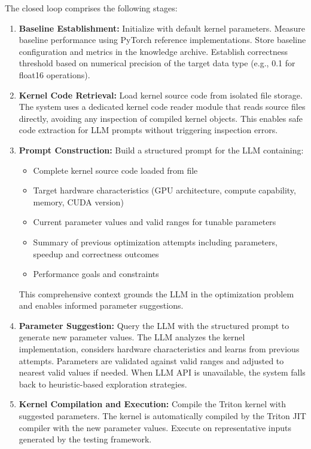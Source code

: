 \documentclass{article}
\begin{document}
The closed loop comprises the following stages:
\begin{enumerate}
    \item {\textbf{Baseline Establishment:} Initialize with default kernel parameters. Measure baseline performance using PyTorch reference implementations. Store baseline configuration and metrics in the knowledge archive. Establish correctness threshold based on numerical precision of the target data type (e.g., 0.1 for float16 operations).}

    \item {\textbf{Kernel Code Retrieval:} Load kernel source code from isolated file storage. The system uses a dedicated kernel code reader module that reads source files directly, avoiding any inspection of compiled kernel objects. This enables safe code extraction for LLM prompts without triggering inspection errors.}

    \item {\textbf{Prompt Construction:} Build a structured prompt for the LLM containing:
    \begin{itemize}
        \item {Complete kernel source code loaded from file}
        \item {Target hardware characteristics (GPU architecture, compute capability, memory, CUDA version)}
        \item {Current parameter values and valid ranges for tunable parameters}
        \item {Summary of previous optimization attempts including parameters, speedup and correctness outcomes}
        \item {Performance goals and constraints}
    \end{itemize}
    This comprehensive context grounds the LLM in the optimization problem and enables informed parameter suggestions.}

    \item {\textbf{Parameter Suggestion:} Query the LLM with the structured prompt to generate new parameter values. The LLM analyzes the kernel implementation, considers hardware characteristics and learns from previous attempts. Parameters are validated against valid ranges and adjusted to nearest valid values if needed. When LLM API is unavailable, the system falls back to heuristic-based exploration strategies.}

    \item {\textbf{Kernel Compilation and Execution:} Compile the Triton kernel with suggested parameters. The kernel is automatically compiled by the Triton JIT compiler with the new parameter values. Execute on representative inputs generated by the testing framework.}


\end{enumerate}
\end{document}
